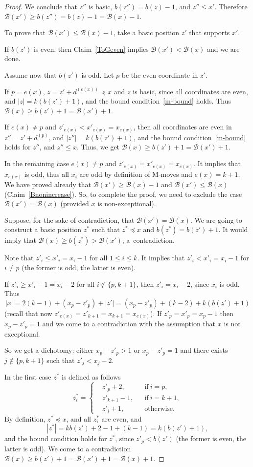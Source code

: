 \documentclass{article}
\theoremstyle{definition}
\def\mv#1{d^{(#1)}}
\def\B{\mathcal{B}}
\begin{document}
\begin{proof}
We conclude that  $z''$ is basic,   $b(z'') = b(z)-1$, and $z''\leq x'$. Therefore $\B(x')\geq b(z'') = b(z)-1 = \B(x)-1$.

  
  \smallskip

  To  prove that  $\B(x') \leq \B(x)-1$, take a basic position $z'$ that supports $x'$.
  
If $b(z')$ is even, then Claim~\ref{ToGeven} implies $\B(x')<\B(x)$ and we are done.

Assume now that $b(z')$ is odd. Let $p$ be the even coordinate in $z'$.

If $p=e(x)$, $z=z'+\mv{e(x)}\preceq x$ and $z$ is basic, since all coordinates are even, and  $|z| = k(b(z')+1)$, and the bound condition~\eqref{m-bound} holds. Thus $\B(x)\geq b(z')+1 = \B(x')+1$. 


If $e(x)\ne p$ and  $z'_{e(x)}< x'_{e(x)} = x_{e(x)}$, then  all coordinates are even in $z'' = z'+\mv{p}$, and $|z''| = k(b(z')+1)$, and the bound condition~\eqref{m-bound} holds for $z''$,  and $z''\leq x$. Thus, we get $\B(x)\geq b(z')+1 = \B(x')+1$.

In the remaining case $e(x)\ne p$ and  $z'_{e(x)}= x'_{e(x)} = x_{e(x)}$. It implies  that $x_{e(x)}$ is odd, thus all $x_i$ are odd by definition of M-moves and $e(x)=k+1$.
We have proved already that $\B(x')\geq \B(x)-1$ and $\B(x')\leq \B(x)$ (Claim~\ref{Bnonincrease}). So, to complete the proof, we need to exclude the case $\B(x')=\B(x)$ (provided $x$ is non-exceptional).

Suppose, for the sake of contradiction, that $\B(x')=\B(x)$.   We are going to construct a basic position $z^*$ such that $z^*\preceq x$ and $b(z^*) = b(z')+1$. It would imply that $\B(x)\geq b(z^*)> \B(x')$, a~contradiction.

Note that $z'_i\leq x'_i = x_i-1$ for all $1\leq i\leq k$. It implies that $z'_i< x'_i=x_i-1$ for $i\ne p$ (the former is odd, the latter is even).

If $z'_i\geq x'_i-1 = x_i-2$ for all $i\notin\{p, k+1\}$, then $z'_i = x_i-2$, since $x_i$ is odd. Thus
\[
|x| =  2(k-1) +(x_p-z'_p)+|z'| =(x_p-z'_p)+(k-2) +k(b(z')+1)
\]
(recall that now $z'_{e(x)} = z'_{k+1} = x_{k+1} = x_{e(x)}$). 
If $z'_p = x'_p = x_p-1$ then $x_p-z'_p=1$ and we come to a contradiction with the assumption that $x$ is not exceptional.

So we get a dichotomy: either $x_p-z'_p>1$ or $x_p-z'_p=1$ and there exists $j\notin\{p,k+1\}$ such that $z'_j< x_j-2$.  

In the first case $z^*$ is defined as follows
\[
z^*_i = \left\{
\begin{aligned}
  &z'_p +2 , &&\text{if}\ i=p,\\
  &z'_{k+1} -1 , &&\text{if}\ i=k+1,\\
  &z'_i+1, &&\text{otherwise.}
\end{aligned}\right.
\]
By definition, $z^*\preceq x$, and all $z^*_i$ are even, and
\[|z^*|= kb(z') + 2-1+(k-1) = k(b(z')+1),\] 
and the bound condition holds for $z^*$, since $z'_p< b(z')$ (the former is even, the latter is odd). We come to a contradiction $\B(x)\geq b(z')+1 = \B(x')+1 = \B(x)+1$.


\end{proof}
\end{document}
